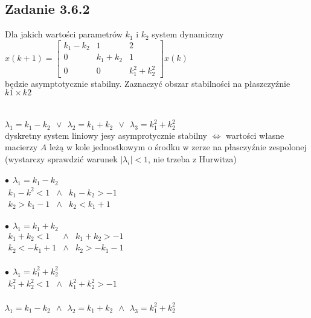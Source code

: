 \subsection*{Zadanie 3.6.2} {\color{darkgray}
	Dla jakich wartości parametrów $k_1$ i $k_2$ system dynamiczny\\
	$x(k+1)=\left[ \begin{array}{ccc}    k_1-k_2 & 1 & 2 \\ 0 & k_1+k_2 & 1 \\ 0 & 0 & k_1^2+k_2^2    \end{array}\right]x(k)$\\
	będzie asymptotycznie stabilny. Zaznaczyć obszar stabilności na płaszczyźnie $k1 \times k2$\\
}\lineh
\\\\
$\lambda_1 = k_1-k_2 \ \ \vee \  \ \lambda_2=k_1+k_2 \ \ \vee \ \ \lambda_3=k_1^2+k_2^2$\\
dyskretny system liniowy jesy asymprotycznie stabilny $\Leftrightarrow$ wartości własne macierzy $A$ leżą w kole jednostkowym o środku w zerze na płasczyźnie zespolonej (wystarczy sprawdzić warunek $|\lambda_i|<1$, nie trzeba z Hurwitza)\\
\\
$\bullet\ \ \lambda_1 = k_1-k_2 $\\
$\begin{array}{ccc}   k_1-k^2<1 & \wedge &k_1-k_2>-1 \\ k_2>k_1-1 & \wedge & k_2<k_1+1    \end{array}$\\
\\
$\bullet\ \ \lambda_1 =k_1+k_2$\\
$\begin{array}{ccc}  k_1+k_2<1 & \wedge & k_1+k_2>-1 \\ k_2<-k_1+1 & \wedge & k_2>-k_1-1    \end{array}$\\
\\
$\bullet\ \ \lambda_1 =k_1^2+k_2^2$\\
$\begin{array}{ccc}  k_1^2+k_2^2<1 &\wedge & k_1^2+k_2^2>-1  \end{array}$\\
\\
$\lambda_1 = k_1-k_2 \ \ \wedge \  \ \lambda_2=k_1+k_2 \ \ \wedge \ \ \lambda_3=k_1^2+k_2^2$\\


